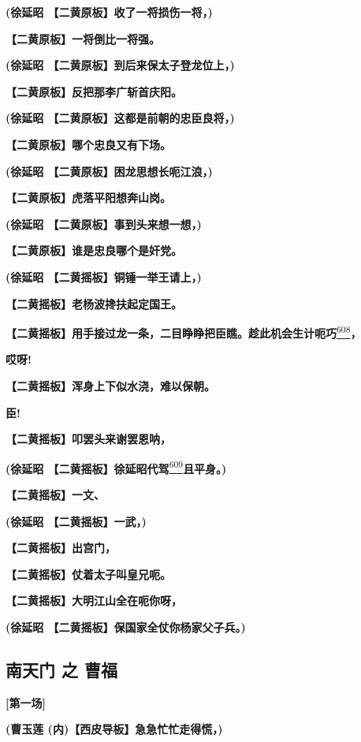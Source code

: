 \textbf{(徐延昭 【二黄原板】收了一将损伤一将，)}

\textbf{【二黄原板】一将倒比一将强。}

\textbf{(徐延昭 【二黄原板】到后来保太子登龙位上，)}

\textbf{【二黄原板】反把那李广斩首庆阳。}

\textbf{(徐延昭 【二黄原板】这都是前朝的忠臣良将，)}

\textbf{【二黄原板】哪个忠良又有下场。}

\textbf{(徐延昭 【二黄原板】困龙思想长呃江浪，)}

\textbf{【二黄原板】虎落平阳想奔山岗。}

\textbf{(徐延昭 【二黄原板】事到头来想一想，)}

\textbf{【二黄原板】谁是忠良哪个是奸党。}

\textbf{(徐延昭 【二黄摇板】铜锤一举王请上，)}

\textbf{【二黄摇板】老杨波搀扶起定国王。}

\textbf{【二黄摇板】用手接过龙一条，二目睁睁把臣瞧。趁此机会生计呃巧}\protect\hyperlink{fn608}{\textsuperscript{608}}\textbf{，}

\textbf{哎呀!}

\textbf{【二黄摇板】浑身上下似水浇，难以保朝。}

\textbf{臣!}

\textbf{【二黄摇板】叩罢头来谢罢恩呐，}

\textbf{(徐延昭
【二黄摇板】徐延昭代驾}\protect\hyperlink{fn609}{\textsuperscript{609}}\textbf{且平身。)}

\textbf{【二黄摇板】一文、}

\textbf{(徐延昭 【二黄摇板】一武，)}

\textbf{【二黄摇板】出宫门，}

\textbf{【二黄摇板】仗着太子叫皇兄呃。}

\textbf{【二黄摇板】大明江山全在呃你呀，}

\textbf{(徐延昭 【二黄摇板】保国家全仗你杨家父子兵。)}

\newpage
\hypertarget{ux5357ux5929ux95e8-ux4e4b-ux66f9ux798f}{%
\subsection{南天门 之
曹福}\label{ux5357ux5929ux95e8-ux4e4b-ux66f9ux798f}}

\textbf{{[}第一场{]}}

\textbf{(曹玉莲 (内)【西皮导板】急急忙忙走得慌，)}

